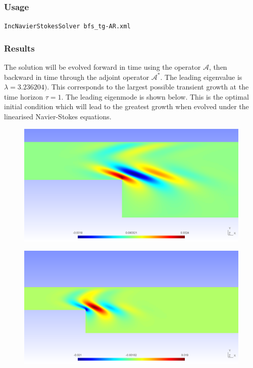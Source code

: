 \subsubsection{Usage}

\texttt{IncNavierStokesSolver bfs\_tg-AR.xml}

\subsubsection{Results}

The solution will be evolved forward in time using the operator $\mathcal{A}$, then backward in time through the adjoint operator $\mathcal{A}^*$. The leading eigenvalue is $\lambda= 3.236204)$. This corresponds to the largest possible transient growth at the time horizon $\tau= 1$. The leading eigenmode is shown below. This is the optimal initial condition which will lead to the greatest growth when evolved under the linearised Navier-Stokes equations.


\begin{figure}[!htbp]
\centering
 {\includegraphics[width=1 \textwidth]{Figures/bfs_eig_u}}
   \caption {}
\end{figure}

\begin{figure}[!htbp]
\centering
 {\includegraphics[width=1 \textwidth]{Figures/bfs_eig_v}}
    \caption {}
\end{figure}


